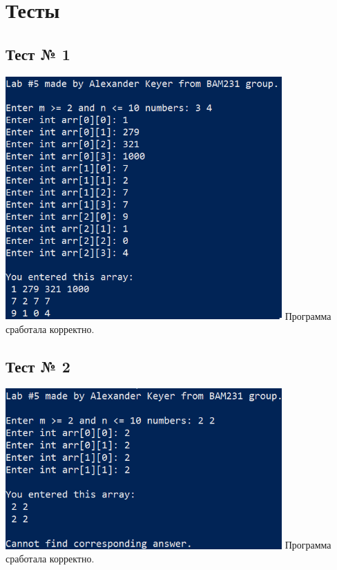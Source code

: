 \documentclass[12pt]{article}
\begin{document}
	\newpage
	
	\section*{Тесты}
	
	\subsection*{Тест № 1}
	\includegraphics[width=400px]{test_1}
	Программа сработала корректно.
	
	\subsection*{Тест № 2}
	\includegraphics[width=400px]{test_2}
	Программа сработала корректно.
	
\end{document}
